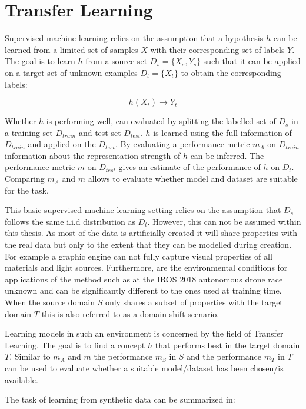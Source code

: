 \chapter{Transfer Learning}
\label{sec:training}

Supervised machine learning relies on the assumption that a hypothesis $h$ can be learned from a limited set of samples $X$ with their corresponding set of labels $Y$. The goal is to learn $h$ from a source set $D_s = \{X_{s},Y_{s}\}$ such that it can be applied on a target set of unknown examples $D_t = \{X_{t}\}$ to obtain the corresponding labels:

$$
h(X_t)\rightarrow Y_t
$$ 

Whether $h$ is performing well, can evaluated by splitting the labelled set of $D_s$ in a training set $D_{train}$ and test set $D_{test}$. $h$ is learned using the full information of $D_{train}$ and applied on the $D_{test}$. By evaluating a performance metric $m_A$ on $D_{train}$ information about the representation strength of $h$ can be inferred. The performance metric $m$ on $D_{test}$ gives an estimate of the performance of $h$ on $D_t$. Comparing $m_A$ and $m$ allows to evaluate whether model and dataset are suitable for the task.
			
This basic supervised machine learning setting relies on the assumption that $D_s$ follows the same i.i.d distribution as $D_t$. However, this can not be assumed within this thesis. As most of the data is artificially created it will share properties with the real data but only to the extent that they can be modelled during creation. For example a graphic engine can not fully capture visual properties of all materials and light sources. Furthermore, are the environmental conditions for applications of the method such as at the IROS 2018 autonomous drone race unknown and can be significantly different to the ones used at training time. When the source domain $S$ only shares a subset of properties with the target domain $T$ this is also referred to as a domain shift scenario. 

Learning models in such an environment is concerned by the field of Transfer Learning. The goal is to find a concept $h$ that performs best in the target domain $T$. Similar to $m_A$ and $m$ the performance $m_S$ in $S$ and the performance $m_T$ in $T$ can be used to evaluate whether a suitable model/dataset has been chosen/is available.

The task of learning from synthetic data can be summarized in:

